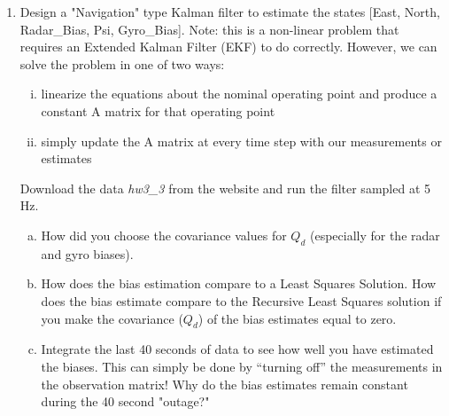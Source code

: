 \documentclass[10pt]{article}
\begin{document}
\begin{enumerate}[label=\textbf{\arabic*.}]
  \vspace{24pt}

  \item Design a "Navigation" type Kalman filter to estimate the states [East, 
  North, Radar\_Bias, Psi, Gyro\_Bias]. Note: this is a non-linear problem that 
  requires an Extended Kalman Filter (EKF) to do correctly. However, we can solve 
  the problem in one of two ways: 
  \begin{enumerate}[(i)]
    \itemsep -2pt
    \item linearize the equations about the nominal operating point and produce 
    a constant A matrix for that operating point
    \item simply update the A matrix at every time step with our measurements or 
    estimates
  \end{enumerate}
  Download the data \emph{hw3\_3} from the website and run the filter sampled at 
  5 Hz.
  \begin{enumerate}[(a)]
    \itemsep -2pt
    \item How did you choose the covariance values for $Q_d$ (especially for the 
    radar and gyro biases).

    \item How does the bias estimation compare to a Least Squares Solution. How 
    does the bias estimate compare to the Recursive Least Squares solution if 
    you make the covariance ($Q_d$) of the bias estimates equal to zero.

    \item Integrate the last 40 seconds of data to see how well you have 
    estimated the biases. This can simply be done by “turning off” the 
    measurements in the observation matrix! Why do the bias estimates remain 
    constant during the 40 second "outage?"
  \end{enumerate}
  \vspace{10pt}


\end{enumerate}
\end{document}
